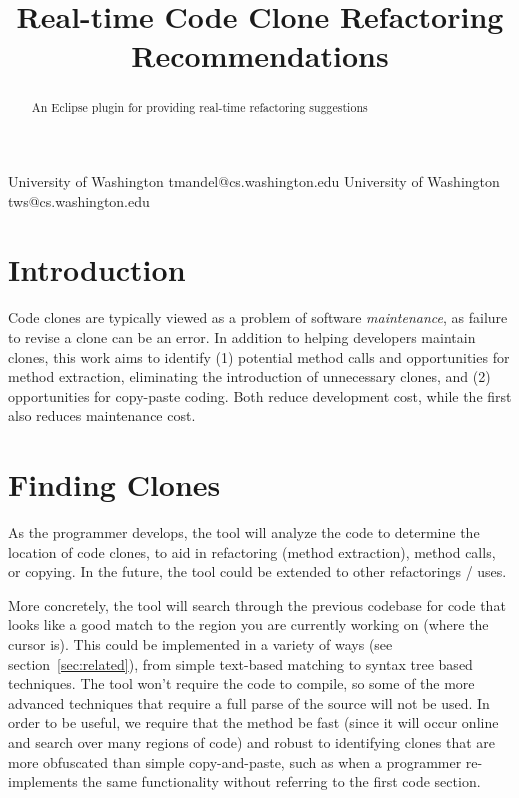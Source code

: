 \documentclass[preprint,10pt]{sigplanconf}
\begin{document}
%

\title{Real-time Code Clone Refactoring Recommendations}
           {University of Washington}
           {tmandel@cs.washington.edu}
           {University of Washington}
           {tws@cs.washington.edu}
\maketitle
\begin{abstract}
An Eclipse plugin for providing real-time refactoring suggestions
\end{abstract}



\section{Introduction}

Code clones are typically viewed as a problem of software
\emph{maintenance}, as failure to revise a clone can be an error. In
addition to helping developers maintain clones, this work aims to
identify (1) potential method calls and opportunities for method
extraction, eliminating the introduction of unnecessary clones, and
(2) opportunities for copy-paste coding. Both reduce development cost,
while the first also reduces maintenance cost.


\section{Finding Clones}


As the programmer develops, the tool will analyze the code to
determine the location of code clones, to aid in refactoring (method
extraction), method calls, or copying. In the future, the tool could
be extended to other refactorings / uses.

More concretely, the tool will search through the previous codebase for code that looks like a good match to the region you are currently working on (where the cursor is). This could be implemented in a variety of ways (see section~\ref{sec:related}), from simple text-based matching to syntax tree based techniques. The tool won't require the code to compile, so some of the more advanced techniques that require a full parse of the source will not be used. In order to be useful, we require that the method be fast (since it will occur online and search over many regions of code) and robust to identifying clones that are more obfuscated than simple copy-and-paste, such as when a programmer re-implements the same functionality without referring to the first code section.
\end{document}
